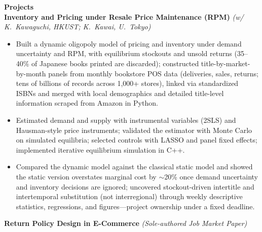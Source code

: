 \documentclass[11pt,letterpaper]{article}
\begin{document}
{\large \textbf{Projects}}\\[-0.5pt]
\textbf{Inventory and Pricing under Resale Price Maintenance (RPM)} \textit{(w/ K.\ Kawaguchi, HKUST; K.\ Kawai, U.\ Tokyo)}\\
\vspace{-6pt}
\begin{itemize}
  \item Built a dynamic oligopoly model of pricing and inventory under demand uncertainty and RPM, with equilibrium stockouts and unsold returns (35--40\% of Japanese books printed are discarded); constructed title-by-market-by-month panels from monthly bookstore POS data (deliveries, sales, returns; tens of billions of records across 1{,}000+ stores), linked via standardized ISBNs and merged with local demographics and detailed title-level information scraped from Amazon in Python.
  \item Estimated demand and supply with instrumental variables (2SLS) and Hausman-style price instruments; validated the estimator with Monte Carlo on simulated equilibria; selected controls with LASSO and panel fixed effects; implemented iterative equilibrium simulation in C++.
  \item Compared the dynamic model against the classical static model and showed the static version overstates marginal cost by \(\sim\)20\% once demand uncertainty and inventory decisions are ignored; uncovered stockout-driven intertitle and intertemporal substitution (not interregional) through weekly descriptive statistics, regressions, and figures---project ownership under a fixed deadline.
\end{itemize}
\vspace{-3pt}
\textbf{Return Policy Design in E-Commerce} \textit{(Sole-authored Job Market Paper)}\\
\vspace{-6pt}
\end{document}
